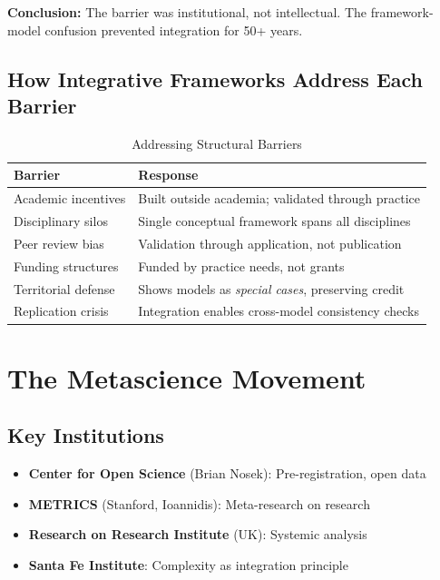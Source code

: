 \documentclass[12pt,a4paper]{article}
\begin{document}
\textbf{Conclusion:} The barrier was institutional, not intellectual. The framework-model confusion prevented integration for 50+ years.

\subsection{How Integrative Frameworks Address Each Barrier}

\begin{table}[H]
\centering
\caption{Addressing Structural Barriers}
\label{tab:ebf-response}
\renewcommand{\arraystretch}{1.4}
\begin{tabular}{@{}p{4cm}p{8cm}@{}}
\toprule
\textbf{Barrier} & \textbf{Response} \\
\midrule
Academic incentives & Built outside academia; validated through practice \\
Disciplinary silos & Single conceptual framework spans all disciplines \\
Peer review bias & Validation through application, not publication \\
Funding structures & Funded by practice needs, not grants \\
Territorial defense & Shows models as \textit{special cases}, preserving credit \\
Replication crisis & Integration enables cross-model consistency checks \\
\bottomrule
\end{tabular}
\end{table}

\section{The Metascience Movement}
\label{sec:metascience}

\subsection{Key Institutions}

\begin{itemize}
\item \textbf{Center for Open Science} (Brian Nosek): Pre-registration, open data
\item \textbf{METRICS} (Stanford, Ioannidis): Meta-research on research
\item \textbf{Research on Research Institute} (UK): Systemic analysis
\item \textbf{Santa Fe Institute}: Complexity as integration principle
\end{itemize}
\end{document}
